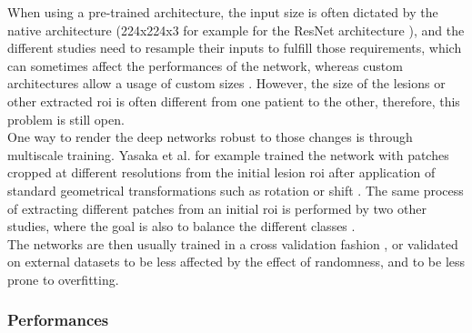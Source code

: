 When using a pre-trained architecture, the input size is often dictated
by the native architecture (224x224x3 for example for the ResNet
architecture \cite{Peng2020,WANG2019}), and
the different studies need to resample their inputs to fulfill those
requirements, which can sometimes affect the performances of the
network, whereas custom architectures allow a usage of custom sizes 
\cite{Liang2018,Yasaka2018,Yasaka2018a}. However, 
the size of the lesions or other extracted \ac{roi} is often different 
from one patient to the other, therefore, this problem is still open.\\
One way to render the deep networks robust to those changes is through
multiscale training. Yasaka et al. for example trained the network
with patches cropped at different resolutions from the initial lesion
\ac{roi} after application of standard geometrical transformations
such as rotation or shift \cite{Yasaka2018}. The same
process of extracting different patches from an initial \ac{roi} is performed
by two other studies, where the goal is also to balance the different
classes \cite{Yasaka2018a,Peng2020}.\\
The networks are then usually trained in a cross validation fashion \cite{Yamada2019,Yasaka2018,Yasaka2018a,WANG2019}, or validated on external datasets \cite{Peng2020} to be less affected by the effect of randomness, and to
be less prone to overfitting.

\subsubsection{Performances}\label{performances}

